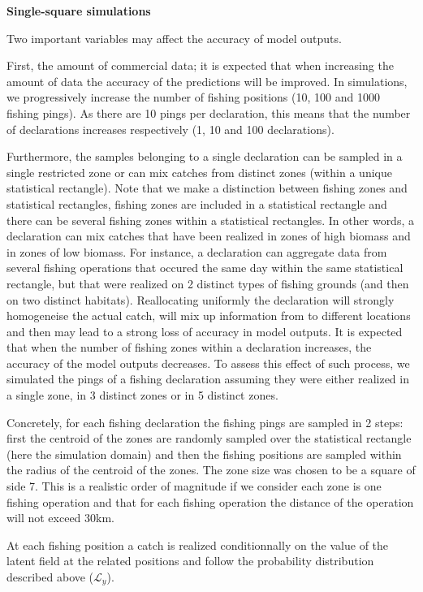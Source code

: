 \documentclass[
  english,
  man]{apa6}
\begin{document}
\textbf{Single-square simulations}

Two important variables may affect the accuracy of model outputs.

First, the amount of commercial data; it is expected that when increasing the amount of data the accuracy of the predictions will be improved. In simulations, we progressively increase the number of fishing positions (10, 100 and 1000 fishing pings). As there are 10 pings per declaration, this means that the number of declarations increases respectively (1, 10 and 100 declarations).

Furthermore, the samples belonging to a single declaration can be sampled in a single restricted zone or can mix catches from distinct zones (within a unique statistical rectangle). Note that we make a distinction between fishing zones and statistical rectangles, fishing zones are included in a statistical rectangle and there can be several fishing zones within a statistical rectangles. In other words, a declaration can mix catches that have been realized in zones of high biomass and in zones of low biomass. For instance, a declaration can aggregate data from several fishing operations that occured the same day within the same statistical rectangle, but that were realized on 2 distinct types of fishing grounds (and then on two distinct habitats). Reallocating uniformly the declaration will strongly homogeneise the actual catch, will mix up information from to different locations and then may lead to a strong loss of accuracy in model outputs. It is expected that when the number of fishing zones within a declaration increases, the accuracy of the model outputs decreases. To assess this effect of such process, we simulated the pings of a fishing declaration assuming they were either realized in a single zone, in 3 distinct zones or in 5 distinct zones.

Concretely, for each fishing declaration the fishing pings are sampled in 2 steps: first the centroid of the zones are randomly sampled over the statistical rectangle (here the simulation domain) and then the fishing positions are sampled within the radius of the centroid of the zones. The zone size was chosen to be a square of side 7. This is a realistic order of magnitude if we consider each zone is one fishing operation and that for each fishing operation the distance of the operation will not exceed 30km.

At each fishing position a catch is realized conditionnally on the value of the latent field at the related positions and follow the probability distribution described above (\(\mathcal{L}_y\)).
\end{document}
